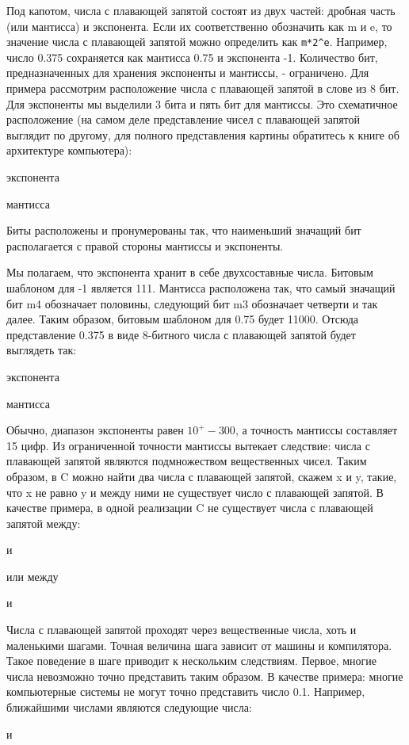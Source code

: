 Под капотом, числа с плавающей запятой состоят из двух частей: дробная часть (или мантисса) и экспонента. Если их соответственно обозначить как m и e, то значение числа с плавающей запятой можно определить как \lstinline|m*2^e|. Например, число 0.375 сохраняется как мантисса 0.75 и экспонента -1. Количество бит, предназначенных для хранения экспоненты и мантиссы, - ограничено. Для примера рассмотрим расположение числа с плавающей запятой в слове из 8 бит. Для экспоненты мы выделили 3 бита и пять бит для мантиссы. Это схематичное расположение (на самом деле представление чисел с плавающей запятой выглядит по другому, для полного представления картины обратитесь к книге об архитектуре компьютера):

экспонента

мантисса

Биты расположены и пронумерованы так, что наименьший значащий бит располагается с правой стороны мантиссы и экспоненты.

Мы полагаем, что экспонента хранит в себе двухсоставные числа. Битовым шаблоном для -1 является 111. Мантисса расположена так, что самый значащий бит m4 обозначает половины, следующий бит m3 обозначает четверти и так далее. Таким образом, битовым шаблоном для 0.75 будет 11000. Отсюда представление 0.375 в виде 8-битного числа с плавающей запятой будет выглядеть так:

экспонента

мантисса

Обычно, диапазон экспоненты равен $10^+-300$, а точность мантиссы составляет 15 цифр. Из ограниченной точности мантиссы вытекает следствие: числа с плавающей запятой являются подмножеством вещественных чисел. Таким образом, в C можно найти два числа с плавающей запятой, скажем x и y, такие, что x не равно y и между ними не существует число с плавающей запятой. В качестве примера, в одной реализации C не существует числа с плавающей запятой между:

и

или между

и

Числа с плавающей запятой проходят через вещественные числа, хоть и маленькими шагами. Точная величина шага зависит от машины и компилятора. Такое поведение в шаге приводит к нескольким следствиям. Первое, многие числа невозможно точно представить таким образом. В качестве примера: многие компьютерные системы не могут точно представить число 0.1. Например, ближайшими числами являются следующие числа:

и

